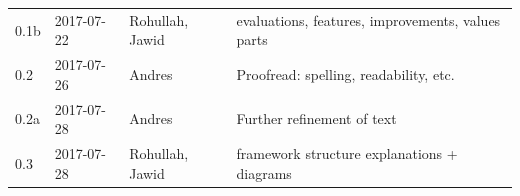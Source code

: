 \begin{longtable}[]{@{}llll@{}}
\begin{minipage}[t]{0.10\columnwidth}
0.1b\strut
\end{minipage} & \begin{minipage}[t]{0.06\columnwidth}\raggedright\strut
2017-07-22\strut
\end{minipage} & \begin{minipage}[t]{0.15\columnwidth}\raggedright\strut
Rohullah, Jawid\strut
\end{minipage} & \begin{minipage}[t]{0.23\columnwidth}\raggedright\strut
evaluations, features, improvements, values parts\strut
\end{minipage}\tabularnewline
\begin{minipage}[t]{0.10\columnwidth}\raggedright\strut
0.2\strut
\end{minipage} & \begin{minipage}[t]{0.06\columnwidth}\raggedright\strut
2017-07-26\strut
\end{minipage} & \begin{minipage}[t]{0.15\columnwidth}\raggedright\strut
Andres\strut
\end{minipage} & \begin{minipage}[t]{0.23\columnwidth}\raggedright\strut
Proofread: spelling, readability, etc.\strut
\end{minipage}\tabularnewline
\begin{minipage}[t]{0.10\columnwidth}\raggedright\strut
0.2a\strut
\end{minipage} & \begin{minipage}[t]{0.06\columnwidth}\raggedright\strut
2017-07-28\strut
\end{minipage} & \begin{minipage}[t]{0.15\columnwidth}\raggedright\strut
Andres\strut
\end{minipage} & \begin{minipage}[t]{0.23\columnwidth}\raggedright\strut
Further refinement of text\strut
\end{minipage}\tabularnewline
\begin{minipage}[t]{0.10\columnwidth}\raggedright\strut
0.3\strut
\end{minipage} & \begin{minipage}[t]{0.06\columnwidth}\raggedright\strut
2017-07-28\strut
\end{minipage} & \begin{minipage}[t]{0.15\columnwidth}\raggedright\strut
Rohullah, Jawid\strut
\end{minipage} & \begin{minipage}[t]{0.23\columnwidth}\raggedright\strut
framework structure explanations + diagrams\strut
\end{minipage}\tabularnewline
\bottomrule
\end{longtable}

